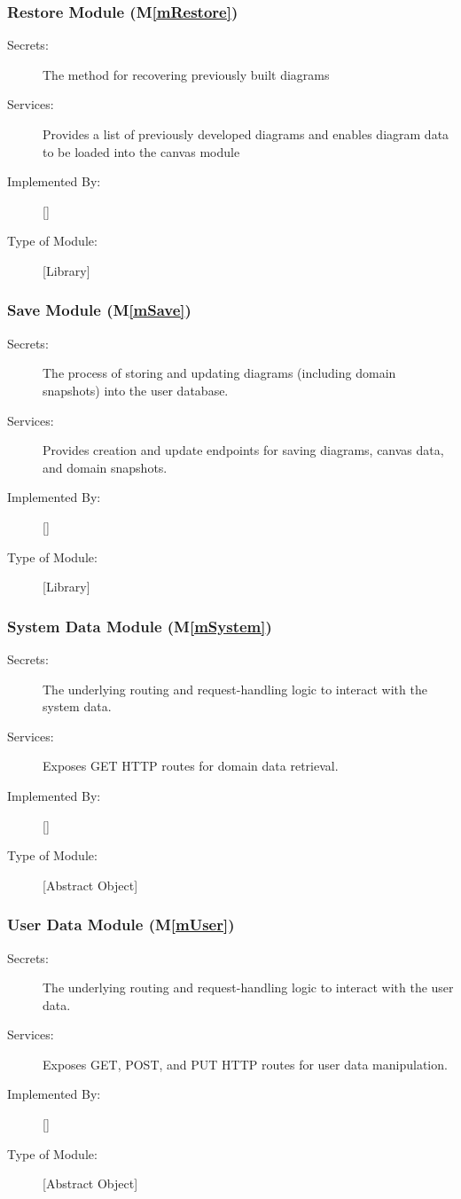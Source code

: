 \documentclass[12pt, titlepage]{article}
\newcommand{\mref}[1]{M\ref{#1}}
\begin{document}
\subsubsection{Restore Module (\mref{mRestore})}
\begin{description}
\item[Secrets:]The method for recovering previously built diagrams 
\item[Services:]Provides a list of previously developed diagrams and enables diagram data to be loaded into the canvas module
\item[Implemented By:] [\progname]
\item[Type of Module:] [Library]
\end{description}

\subsubsection{Save Module (\mref{mSave})}
\begin{description}
\item[Secrets:] The process of storing and updating diagrams (including domain snapshots) into the user database.
\item[Services:] Provides creation and update endpoints for saving diagrams, canvas data, and domain snapshots.
\item[Implemented By:] [\progname]
\item[Type of Module:] [Library]
\end{description}

\subsubsection{System Data Module (\mref{mSystem})}
\begin{description}
\item[Secrets:] The underlying routing and request-handling logic to interact with the system data.
\item[Services:] Exposes GET HTTP routes for domain data retrieval.
\item[Implemented By:] [\progname]
\item[Type of Module:] [Abstract Object]
\end{description}

\subsubsection{User Data Module (\mref{mUser})}
\begin{description}
\item[Secrets:] The underlying routing and request-handling logic to interact with the user data.
\item[Services:] Exposes GET, POST, and PUT HTTP routes for user data manipulation.
\item[Implemented By:] [\progname]
\item[Type of Module:] [Abstract Object]
\end{description}
\end{document}
